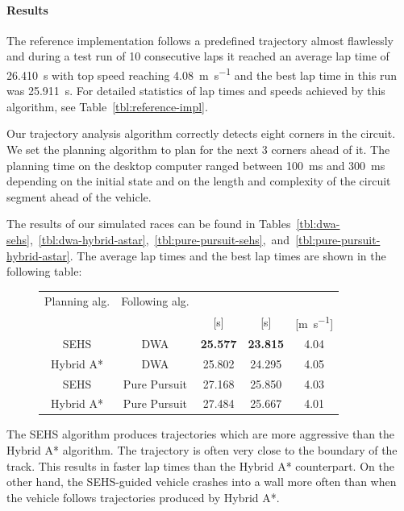 \paragraph{Results}

The reference implementation follows a predefined trajectory almost flawlessly and during a test run of 10 consecutive laps it reached an average lap time of \SI{26.410}{\second} with top speed reaching \SI{4.08}{\meter\per\second} and the best lap time in this run was \SI{25.911}{\second}. For detailed statistics of lap times and speeds achieved by this algorithm, see Table~\ref{tbl:reference-impl}.

Our trajectory analysis algorithm correctly detects eight corners in the circuit. We set the planning algorithm to plan for the next 3 corners ahead of it. The planning time on the desktop computer ranged between \SI{100}{\milli\second} and \SI{300}{\milli\second} depending on the initial state and on the length and complexity of the circuit segment ahead of the vehicle.

The results of our simulated races can be found in Tables~\ref{tbl:dwa-sehs},~\ref{tbl:dwa-hybrid-astar},~\ref{tbl:pure-pursuit-sehs},~and~\ref{tbl:pure-pursuit-hybrid-astar}. The average lap times and the best lap times are shown in the following table:

\begin{figure}[H]
	\centering
	\robustify\bfseries
	\begin{tabular}{c c S[detect-weight] S[detect-weight] S}
		\toprule
		Planning alg. & Following alg. &  &  &  \\
		 &  & [\si{\second}] & [\si{\second}] & [\si{\meter\per\second}]       \\
		\midrule
		SEHS & DWA & \bfseries 25.577 & \bfseries 23.815 & 4.04 \\
		Hybrid A* & DWA & 25.802 & 24.295 & 4.05 \\
		SEHS & Pure Pursuit & 27.168 & 25.850 & 4.03 \\
		Hybrid A* & Pure Pursuit & 27.484 & 25.667 & 4.01 \\
		\bottomrule
	\end{tabular}
\end{figure}

The SEHS algorithm produces trajectories which are more aggressive than the Hybrid A* algorithm. The trajectory is often very close to the boundary of the track. This results in faster lap times than the Hybrid A* counterpart. On the other hand, the SEHS-guided vehicle crashes into a wall more often than when the vehicle follows trajectories produced by Hybrid A*.

